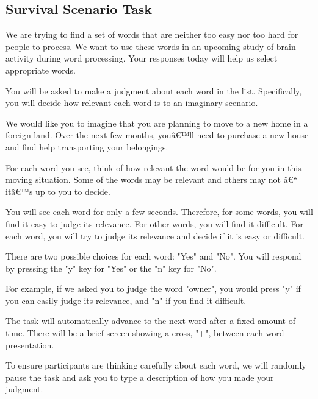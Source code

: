 \documentclass[man,natbib,floatsintext]{apa6} %
\begin{document}
\subsection{Survival Scenario Task}
\begin{displayquote}
We are trying to find a set of words that are neither too easy nor too hard for people to process. We want to use these words in an upcoming study of brain activity during word processing. Your responses today will help us select appropriate words.

You will be asked to make a judgment about each word in the list. Specifically, you will decide how relevant each word is to an imaginary scenario.

We would like you to imagine that you are planning to move to a new home in a foreign land. Over the next few months, youâ€™ll need to purchase a new house and find help transporting your belongings.

For each word you see, think of how relevant the word would be for you in this moving situation. Some of the words may be relevant and others may not â€“ itâ€™s up to you to decide.

You will see each word for only a few seconds. Therefore, for some words, you will find it easy to judge its relevance. For other words, you will find it difficult. For each word, you will try to judge its relevance and decide if it is easy or difficult.

There are two possible choices for each word: "Yes" and "No". You will respond by pressing the "y" key for "Yes" or the "n" key for "No".

For example, if we asked you to judge the word "owner", you would press "y" if you can easily judge its relevance, and "n" if you find it difficult.

The task will automatically advance to the next word after a fixed amount of time. There will be a brief screen showing a cross, "+", between each word presentation.

To ensure participants are thinking carefully about each word, we will randomly pause the task and ask you to type a description of how you made your judgment.
\end{displayquote}
\end{document}
